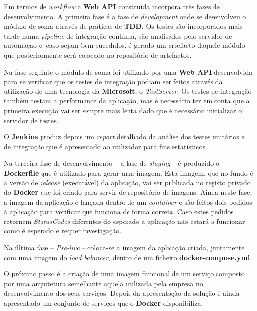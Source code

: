 \hspace{1cm}Em termos de \textit{workflow} a \textbf{Web API} construída incorpora três fases de desenvolvimento. A primeira fase é a fase de \textit{development} onde se desenvolveu o módulo de soma através de práticas de \textbf{TDD}. Os testes são incorporados mais tarde numa \textit{pipeline} de integração contínua, são analisados pelo servidor de automação e, caso sejam bem-sucedidos, é gerado um artefacto daquele módulo que posteriormente será colocado no repositório de artefactos. 

\hspace{1cm}Na fase seguinte o módulo de soma foi utilizado por uma \textbf{Web API} desenvolvida para se verificar que os testes de integração podiam ser feitos através da utilização de uma tecnologia da \textbf{Microsoft}, o \textit{TestServer}. Os testes de integração também testam a performance da aplicação, mas é necessário ter em conta que a primeira execução vai ser sempre mais lenta dado que é necessário inicializar o servidor de testes.

\hspace{1cm}O \textbf{Jenkins} produz depois um \textit{report} detalhado da análise dos testes unitários e de integração que é apresentado ao utilizador para fins estatísticos.

\hspace{1cm}Na terceira fase de desenvolvimento -- a fase de \textit{staging} -- é produzido o \textbf{Dockerfile} que é utilizado para gerar uma imagem. Esta imagem, que no fundo é a versão de \textit{release} (executável) da aplicação, vai ser publicada no registo privado do \textbf{Docker} que foi criado para servir de repositório de imagens. Ainda neste fase, a imagem da aplicação é lançada dentro de um \textit{container} e são feitos dois pedidos à aplicação para verificar que funciona de forma correta. Caso estes pedidos retornem \textit{StatusCodes} diferentes do esperado a aplicação não estará a funcionar como é esperado e requer investigação.

\hspace{1cm}Na última fase -- \textit{Pre-live} -- coloca-se a imagem da aplicação criada, juntamente com uma imagem do \textit{load balancer}, dentro de um ficheiro \textbf{docker-compose.yml}.

\hspace{1cm}O próximo passo é a criação de uma imagem funcional de um serviço composto por uma arquitetura semelhante aquela utilizada pela empresa no desenvolvimento dos seus serviços. Depois da apresentação da solução é ainda apresentado um conjunto de serviços que o \textbf{Docker} disponibiliza.

